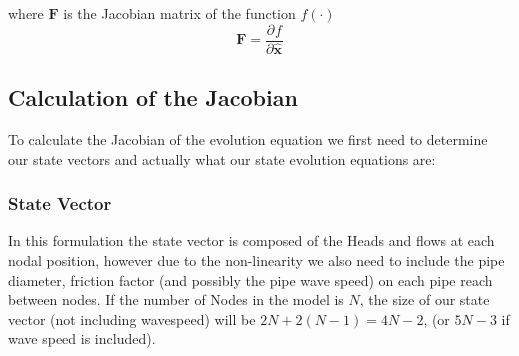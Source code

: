 \documentclass[]{article}
\providecommand{\pdiff}[3]{\frac{\partial^{#3} #1}{\partial #2^{#3}}}
\begin{document}
where $\mathbf{F}$ is the Jacobian matrix of the function $f(\cdot)$
\begin{equation}
 \mathbf{F} = \pdiff{f}{\mathbf{\hat{x}}}{}
\end{equation}


\subsection{Calculation of the Jacobian}
To calculate the Jacobian of the evolution equation we first need to determine our state vectors and actually what our state evolution equations are:

\subsubsection{State Vector}
In this formulation the state vector is composed of the Heads and flows at each nodal position, however due to the non-linearity we also need to include the pipe diameter, friction factor (and possibly the pipe wave speed) on each pipe reach between nodes.  
If the number of Nodes in the model is $N$, the size of our state vector (not including wavespeed) will be $2N + 2(N-1) = 4N -2$, (or $5N-3$ if wave speed is included).
\end{document}
